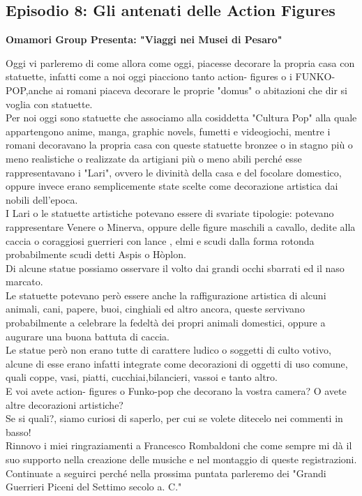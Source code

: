 \documentclass[hidelinks,12pt,a4paper]{article}
\begin{document}
\begin{flushleft}
		\section{Episodio 8: Gli antenati delle Action Figures}
		\begin{center}
			\textbf{Omamori Group Presenta: "Viaggi nei Musei di Pesaro"}
		\end{center}
		Oggi vi parleremo di come allora come oggi, piacesse decorare la propria casa con statuette, infatti come a noi oggi piacciono tanto action- figures o i FUNKO-POP,anche ai romani piaceva decorare le proprie "domus" o abitazioni che dir si voglia con statuette.\\
		Per noi oggi sono statuette che associamo alla cosiddetta "Cultura Pop" alla quale appartengono anime, manga, graphic novels, fumetti e videogiochi, mentre i romani decoravano la propria casa con queste statuette bronzee o in stagno più o meno realistiche o realizzate da artigiani più o meno abili perché esse rappresentavano i "Lari", ovvero le divinità della casa e del focolare domestico, oppure invece erano semplicemente state scelte come decorazione artistica dai nobili dell'epoca.\\
		I Lari o le statuette artistiche potevano essere di svariate tipologie: potevano rappresentare Venere o Minerva, oppure delle figure maschili a cavallo, dedite alla caccia o coraggiosi guerrieri con lance , elmi e scudi dalla forma rotonda probabilmente scudi detti Aspis o Hòplon.\\
		Di alcune statue possiamo osservare il volto dai grandi occhi sbarrati ed il naso marcato.\\
		Le statuette potevano però essere anche la raffigurazione artistica di alcuni animali, cani, papere, buoi, cinghiali ed altro ancora, queste servivano probabilmente a celebrare la fedeltà dei propri animali domestici, oppure a augurare una buona battuta di caccia.\\
		Le statue però non erano tutte di carattere ludico o soggetti di culto votivo, alcune di esse erano infatti integrate come decorazioni di oggetti di uso comune, quali coppe, vasi, piatti, cucchiai,bilancieri, vassoi e tanto altro.\\
		E voi avete action- figures o Funko-pop  che decorano la vostra camera? O avete altre decorazioni artistiche?\\
		Se si quali?, siamo curiosi di saperlo, per cui se volete ditecelo nei commenti in basso!\\
		Rinnovo i miei ringraziamenti a Francesco Rombaldoni che come sempre mi dà il suo supporto nella creazione delle musiche e nel montaggio di queste registrazioni.\\
		Continuate a seguirci perché nella prossima puntata parleremo dei "Grandi Guerrieri Piceni del Settimo secolo a. C."\\
		

\end{flushleft}
\end{document}
